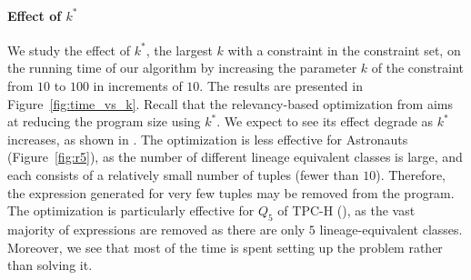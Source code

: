 
\paragraph*{Effect of $k^*$}
We study the effect of $k^*$, the largest $k$ with a constraint in the constraint set, on the running time of our algorithm by increasing the parameter $k$ of the constraint from $10$ to $100$ in increments of $10$. The results are presented in Figure~\ref{fig:time_vs_k}. Recall that the relevancy-based optimization from  aims at reducing the program size using $k^*$. 
We expect to see its effect degrade as $k^*$ increases, as shown in . 
The optimization is less effective for  Astronauts (Figure~\ref{fig:r5}), as the number of different lineage equivalent classes is large, and each consists of a relatively small number of tuples (fewer than $10$). 
Therefore, the expression generated for very few tuples may be removed from the program. The optimization is particularly effective for $Q_5$ of TPC-H (), as the vast majority of expressions are removed as there are only $5$ lineage-equivalent classes. Moreover, we see that most of the time is spent setting up the problem rather than solving it.

